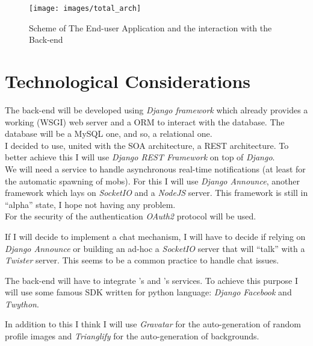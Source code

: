 	\begin{landscape}
		\begin{figure}[H]
			\centering
			\texttt{[image: images/total\_arch]}
			\caption{Scheme of The End-user Application and the interaction with the Back-end}
			\label{fig:total_arch}
		\end{figure}
	\end{landscape}

	\section{Technological Considerations}
	The back-end will be developed using \textit{Django framework} which already provides a working (WSGI) web server and a ORM to interact with the database. The database will be a MySQL one, and so, a relational one.\\
	I decided to use, united with the SOA architecture, a REST architecture. To better achieve this I will use \textit{Django REST Framework} on top of \textit{Django}.\\
	We will need a service to handle asynchronous real-time notifications (at least for the automatic spawning of mobs). For this I will use \textit{Django Announce}, another framework which lays on \textit{SocketIO} and a \textit{NodeJS} server. This framework is still in ``alpha'' state, I hope not having any problem.\\
	For the security of the authentication \textit{OAuth2} protocol will be used.

	If I will decide to implement a chat mechanism, I will have to decide if relying on \textit{Django Announce} or building an ad-hoc a \textit{SocketIO} server that will ``talk'' with a \textit{Twister} server. This seems to be a common practice to handle chat issues.

	The back-end will have to integrate \Facebook{}'s and \Twitter{}'s services. To achieve this purpose I will use some famous SDK written for python language: \textit{Django Facebook} and \textit{Twython}.

	In addition to this I think I will use \textit{Gravatar} for the auto-generation of random profile images and \textit{Trianglify} for the auto-generation of backgrounds.
	